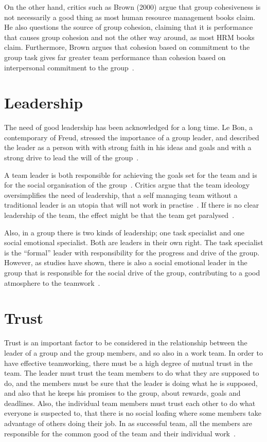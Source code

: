\documentclass[a4paper,12pt,titlepage]{article}
\begin{document}
  On the other hand, critics such as Brown (2000) argue
  that group cohesiveness
  is not necessarily a good thing as most human resource
  management books claim. He also questions the source of group
  cohesion, claiming that it is performance that causes group
  cohesion and not the other way around, as most HRM books claim.
  Furthermore, Brown argues that cohesion based on commitment
  to the group task gives far greater team performance than cohesion
  based on interpersonal commitment to the group~\cite[53]{rb}.
  
  \section{Leadership}
  The need of good leadership has been acknowledged for a long time. Le Bon,
  a contemporary of Freud, stressed the importance of a group leader, and
  described the leader as a person with with strong faith in his
  ideas and goals and with a strong drive to lead the
  will of the group~\cite[81]{sf}. 

  A team leader is both responsible for achieving the goals set for the
  team and is for the social organisation of the group~\cite[392]{ahdb}.
  Critics argue that the team ideology oversimplifies the need of
  leadership, that a self managing team without a traditional leader
  is an utopia that will not work in practise~\cite[304]{sr}.
  If there is no clear leadership of the team, the effect might be
  that the team get paralysed~\cite[293-301]{sr}.

  Also, in a group there is two kinds of leadership; one task specialist
  and one social emotional specialist. Both are leaders in their own right.
  The task specialist is the ``formal'' leader with responsibility for
  the progress and drive of the group. However, as studies have shown,
  there is also a social emotional leader in the group that is responsible
  for the social drive of the group, contributing to a good atmosphere to the
  teamwork~\cite[69]{rb}.

  \section{Trust}
  Trust is an important factor to be considered in the relationship
  between the leader of a group and the group members, and so also
  in a work team. In order to have effective teamworking, there must
  be a high degree of mutual trust in the team. The leader must
  trust the team members to do what they are supposed to do, and the
  members must be sure that the leader is doing what he is supposed, and
  also that he keeps his promises to the group, about rewards, goals
  and deadlines. Also, the individual team members must trust each other
  to do what everyone is suspected to, that there is no social loafing
  where some members take advantage of others doing their job.
  In as successful team, all the members are responsible for the
  common good of the team and their individual work~\cite[293]{sr}.
\end{document}
